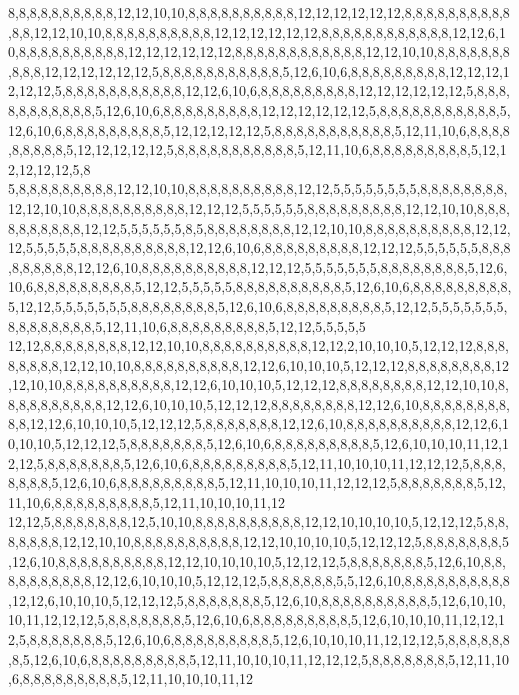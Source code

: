 8,8,8,8,8,8,8,8,8,8,12,12,10,10,8,8,8,8,8,8,8,8,8,8,12,12,12,12,12,12,8,8,8,8,8,8,8,8,8,8,8,8,12,12,10,10,8,8,8,8,8,8,8,8,8,8,12,12,12,12,12,12,8,8,8,8,8,8,8,8,8,8,8,8,12,12,6,10,8,8,8,8,8,8,8,8,8,8,12,12,12,12,12,12,8,8,8,8,8,8,8,8,8,8,8,8,12,12,10,10,8,8,8,8,8,8,8,8,8,8,12,12,12,12,12,12,5,8,8,8,8,8,8,8,8,8,8,8,5,12,6,10,6,8,8,8,8,8,8,8,8,8,12,12,12,12,12,12,5,8,8,8,8,8,8,8,8,8,8,8,12,12,6,10,6,8,8,8,8,8,8,8,8,8,12,12,12,12,12,12,5,8,8,8,8,8,8,8,8,8,8,8,5,12,6,10,6,8,8,8,8,8,8,8,8,8,12,12,12,12,12,12,5,8,8,8,8,8,8,8,8,8,8,8,5,12,6,10,6,8,8,8,8,8,8,8,8,8,5,12,12,12,12,12,5,8,8,8,8,8,8,8,8,8,8,8,5,12,11,10,6,8,8,8,8,8,8,8,8,8,5,12,12,12,12,12,5,8,8,8,8,8,8,8,8,8,8,8,5,12,11,10,6,8,8,8,8,8,8,8,8,8,5,12,12,12,12,12,5,8
5,8,8,8,8,8,8,8,8,8,12,12,10,10,8,8,8,8,8,8,8,8,8,8,12,12,5,5,5,5,5,5,5,5,8,8,8,8,8,8,8,8,12,12,10,10,8,8,8,8,8,8,8,8,8,8,12,12,12,5,5,5,5,5,5,8,8,8,8,8,8,8,8,8,12,12,10,10,8,8,8,8,8,8,8,8,8,8,12,12,5,5,5,5,5,5,8,5,8,8,8,8,8,8,8,8,12,12,10,10,8,8,8,8,8,8,8,8,8,8,12,12,12,5,5,5,5,5,8,8,8,8,8,8,8,8,8,8,12,12,6,10,6,8,8,8,8,8,8,8,8,8,12,12,12,5,5,5,5,5,5,8,8,8,8,8,8,8,8,8,12,12,6,10,8,8,8,8,8,8,8,8,8,8,12,12,12,5,5,5,5,5,5,5,8,8,8,8,8,8,8,8,5,12,6,10,6,8,8,8,8,8,8,8,8,8,5,12,12,5,5,5,5,5,8,8,8,8,8,8,8,8,8,8,5,12,6,10,6,8,8,8,8,8,8,8,8,8,5,12,12,5,5,5,5,5,5,5,8,8,8,8,8,8,8,8,5,12,6,10,6,8,8,8,8,8,8,8,8,8,5,12,12,5,5,5,5,5,5,5,8,8,8,8,8,8,8,8,5,12,11,10,6,8,8,8,8,8,8,8,8,8,5,12,12,5,5,5,5,5
12,12,8,8,8,8,8,8,8,8,12,12,10,10,8,8,8,8,8,8,8,8,8,8,12,12,2,10,10,10,5,12,12,12,8,8,8,8,8,8,8,8,12,12,10,10,8,8,8,8,8,8,8,8,8,8,12,12,6,10,10,10,5,12,12,12,8,8,8,8,8,8,8,8,12,12,10,10,8,8,8,8,8,8,8,8,8,8,12,12,6,10,10,10,5,12,12,12,8,8,8,8,8,8,8,8,12,12,10,10,8,8,8,8,8,8,8,8,8,8,12,12,6,10,10,10,5,12,12,12,8,8,8,8,8,8,8,8,12,12,6,10,8,8,8,8,8,8,8,8,8,8,12,12,6,10,10,10,5,12,12,12,5,8,8,8,8,8,8,8,12,12,6,10,8,8,8,8,8,8,8,8,8,8,12,12,6,10,10,10,5,12,12,12,5,8,8,8,8,8,8,8,5,12,6,10,6,8,8,8,8,8,8,8,8,8,5,12,6,10,10,10,11,12,12,12,5,8,8,8,8,8,8,8,5,12,6,10,6,8,8,8,8,8,8,8,8,8,5,12,11,10,10,10,11,12,12,12,5,8,8,8,8,8,8,8,5,12,6,10,6,8,8,8,8,8,8,8,8,8,5,12,11,10,10,10,11,12,12,12,5,8,8,8,8,8,8,8,5,12,11,10,6,8,8,8,8,8,8,8,8,8,5,12,11,10,10,10,11,12
12,12,5,8,8,8,8,8,8,8,12,5,10,10,8,8,8,8,8,8,8,8,8,8,12,12,10,10,10,10,5,12,12,12,5,8,8,8,8,8,8,8,12,12,10,10,8,8,8,8,8,8,8,8,8,8,12,12,10,10,10,10,5,12,12,12,5,8,8,8,8,8,8,8,5,12,6,10,8,8,8,8,8,8,8,8,8,8,12,12,10,10,10,10,5,12,12,12,5,8,8,8,8,8,8,8,5,12,6,10,8,8,8,8,8,8,8,8,8,8,12,12,6,10,10,10,5,12,12,12,5,8,8,8,8,8,8,5,5,12,6,10,8,8,8,8,8,8,8,8,8,8,12,12,6,10,10,10,5,12,12,12,5,8,8,8,8,8,8,8,5,12,6,10,8,8,8,8,8,8,8,8,8,8,5,12,6,10,10,10,11,12,12,12,5,8,8,8,8,8,8,8,5,12,6,10,6,8,8,8,8,8,8,8,8,8,5,12,6,10,10,10,11,12,12,12,5,8,8,8,8,8,8,8,5,12,6,10,6,8,8,8,8,8,8,8,8,8,5,12,6,10,10,10,11,12,12,12,5,8,8,8,8,8,8,8,5,12,6,10,6,8,8,8,8,8,8,8,8,8,5,12,11,10,10,10,11,12,12,12,5,8,8,8,8,8,8,8,5,12,11,10,6,8,8,8,8,8,8,8,8,8,5,12,11,10,10,10,11,12
